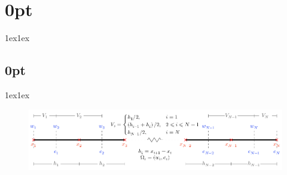 \documentclass{article}
\begin{document}
\titlespacing*\section{0pt}{1ex}{1ex}
\titlespacing*\subsection{0pt}{1ex}{1ex}
%
\setlength\abovecaptionskip{8pt}
\setlength\belowcaptionskip{-15pt}
\setlength\textfloatsep{0pt}
%
\setlength\abovedisplayskip{1pt}
\setlength\belowdisplayskip{1pt}
\begin{figure}[H]
    \centering
    \includegraphics[width = 0.8\linewidth]{figures/1d-fvm-exam.pdf}
\end{figure}
\end{document}
